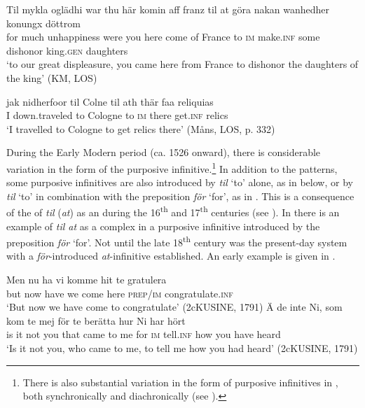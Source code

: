 \documentclass[output=paper]{langscibook}
\begin{document}
\ea
\label{ex:kalm:10}
\ea  \label{ex:kalm:10a}
\gll Til mykla oglädhi war thu här komin aff franz til at göra nakan wanhedher konungx döttrom\\
for much unhappiness were you here come of France to \textsc{im} make.\textsc{inf} some dishonor king.\textsc{gen} daughters\\
\glt ‘to our great displeasure, you came here from France to dishonor the daughters of the king’ (KM, LOS)

\ex\label{ex:kalm:10b}
\gll jak nidherfoor til Colne til ath thär faa reliquias\\
 I down.traveled to Cologne to \textsc{im} there get.\textsc{inf} relics\\
\glt ‘I travelled to Cologne to get relics there’ (Måns, LOS, p. 332)
\z 
\z 


During the Early Modern period (ca. 1526 onward), there is considerable variation in the form of the purposive infinitive.\footnote{There is also substantial variation in the form of purposive infinitives in , both synchronically and diachronically (see \citealt{Demske2011}).}  In addition to the  patterns, some purposive infinitives are also introduced by \textit{til} ‘to’ alone, as in  below, or by \textit{til} ‘to’ in combination with the preposition \textit{för} ‘for’, as in . This is a consequence of the  of \textit{til} (\textit{at}) as an  during the 16\textsuperscript{th} and 17\textsuperscript{th} centuries (see \cites[]{Kalm2014}[]{Kalm2016Prepositioner}[203–221]{Kalm2016Satsekvivalenta}). In  there is an example of \textit{til at} as a complex  in a purposive infinitive introduced by the preposition \textit{för} ‘for’. Not until the late 18\textsuperscript{th} century was the present-day system with a \textit{för}{}-introduced \textit{at}{}-infinitive established. An early example is given in . 


\ea
\label{ex:kalm:11}
\ea  \label{ex:kalm:11a}
\gll Men nu ha vi komme hit te gratulera\\
but now have we come here \textsc{prep}/\textsc{im} congratulate.\textsc{inf}\\
\glt ‘But now we have come to congratulate’ (2cKUSINE, 1791) 
\ex  \label{ex:kalm:11b}
\gll Ä de inte Ni, som kom te mej för te berätta hur Ni har hört\\
is it not you that came to me for \textsc{im} tell.\textsc{inf} how you have heard\\
\glt ‘Is it not you, who came to me, to tell me how you had heard’ (2cKUSINE, 1791)
\end{document}
